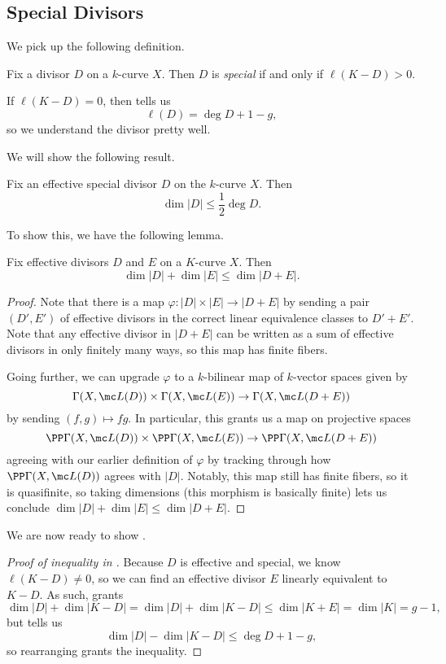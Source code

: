 \documentclass[../notes.tex]{subfiles}
\begin{document}
\subsection{Special Divisors}
We pick up the following definition.
\begin{definition}[special]
	Fix a divisor $D$ on a $k$-curve $X$. Then $D$ is \textit{special} if and only if $\ell(K-D)>0$.
\end{definition}
\begin{remark}
	If $\ell(K-D)=0$, then  tells us
	\[\ell(D)=\deg D+1-g,\]
	so we understand the divisor pretty well.
\end{remark}
We will show the following result.
\begin{proposition}[Clifford] \label{prop:clifford}
	Fix an effective special divisor $D$ on the $k$-curve $X$. Then
	\[\dim|D|\le\frac12\deg D.\]
\end{proposition}
To show this, we have the following lemma.
\begin{lemma} \label{lem:add-divisors-dim}
	Fix effective divisors $D$ and $E$ on a $K$-curve $X$. Then
	\[\dim|D|+\dim|E|\le\dim|D+E|.\]
\end{lemma}
\begin{proof}
	Note that there is a map $\varphi\colon|D|\times|E|\to|D+E|$ by sending a pair $(D',E')$ of effective divisors in the correct linear equivalence classes to $D'+E'$. Note that any effective divisor in $|D+E|$ can be written as a sum of effective divisors in only finitely many ways, so this map has finite fibers.

	Going further, we can upgrade $\varphi$ to a $k$-bilinear map of $k$-vector spaces given by
	\[\Gamma(X,\mc L(D))\times\Gamma(X,\mc L(E))\to\Gamma(X,\mc L(D+E))\]
	by sending $(f,g)\mapsto fg$. In particular, this grants us a map on projective spaces
	\[\PP\Gamma(X,\mc L(D))\times\PP\Gamma(X,\mc L(E))\to\PP\Gamma(X,\mc L(D+E))\]
	agreeing with our earlier definition of $\varphi$ by tracking through how $\PP\Gamma(X,\mc L(D))$ agrees with $|D|$. Notably, this map still has finite fibers, so it is quasifinite, so taking dimensions (this morphism is basically finite) lets us conclude $\dim|D|+\dim|E|\le\dim|D+E|$.
\end{proof}
We are now ready to show .
\begin{proof}[Proof of inequality in ]
	Because $D$ is effective and special, we know $\ell(K-D)\ne0$, so we can find an effective divisor $E$ linearly equivalent to $K-D$. As such,  grants
	\[\dim|D|+\dim|K-D|=\dim|D|+\dim|K-D|\le\dim|K+E|=\dim|K|=g-1,\]
	but  tells us
	\[\dim|D|-\dim|K-D|\le\deg D+1-g,\]
	so rearranging grants the inequality.
\end{proof}
\end{document}

